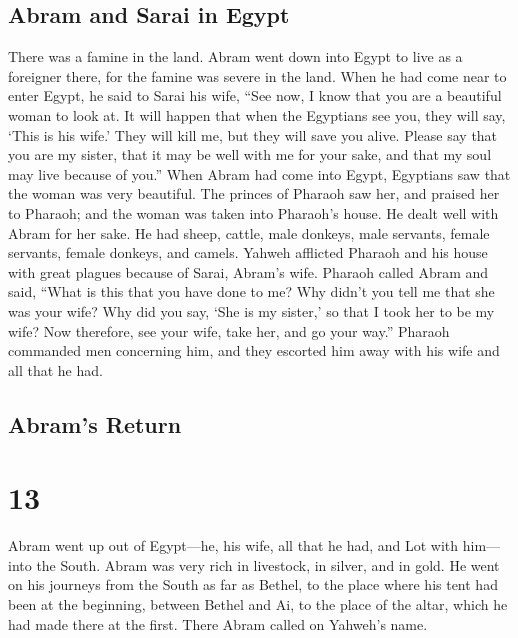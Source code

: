 \hypertarget{abram-and-sarai-in-egypt}{%
\subsection{Abram and Sarai in Egypt}\label{abram-and-sarai-in-egypt}}

 There was a famine in the land. Abram went down into
Egypt to live as a foreigner there, for the famine was severe in the
land.  When he had come near to enter Egypt, he said to
Sarai his wife, ``See now, I know that you are a beautiful woman to look
at.  It will happen that when the Egyptians see you, they
will say, `This is his wife.' They will kill me, but they will save you
alive.  Please say that you are my sister, that it may be
well with me for your sake, and that my soul may live because of you.''
 When Abram had come into Egypt, Egyptians saw that the
woman was very beautiful.  The princes of Pharaoh saw
her, and praised her to Pharaoh; and the woman was taken into Pharaoh's
house.  He dealt well with Abram for her sake. He had
sheep, cattle, male donkeys, male servants, female servants, female
donkeys, and camels.  Yahweh afflicted Pharaoh and his
house with great plagues because of Sarai, Abram's wife. 
Pharaoh called Abram and said, ``What is this that you have done to me?
Why didn't you tell me that she was your wife?  Why did
you say, `She is my sister,' so that I took her to be my wife? Now
therefore, see your wife, take her, and go your way.'' 
Pharaoh commanded men concerning him, and they escorted him away with
his wife and all that he had.

\hypertarget{abrams-return}{%
\subsection{Abram's Return}\label{abrams-return}}

\hypertarget{section-12}{%
\section{13}\label{section-12}}

 Abram went up out of Egypt---he, his wife, all that he
had, and Lot with him---into the South.  Abram was very
rich in livestock, in silver, and in gold.  He went on his
journeys from the South as far as Bethel, to the place where his tent
had been at the beginning, between Bethel and Ai,  to the
place of the altar, which he had made there at the first. There Abram
called on Yahweh's name.

